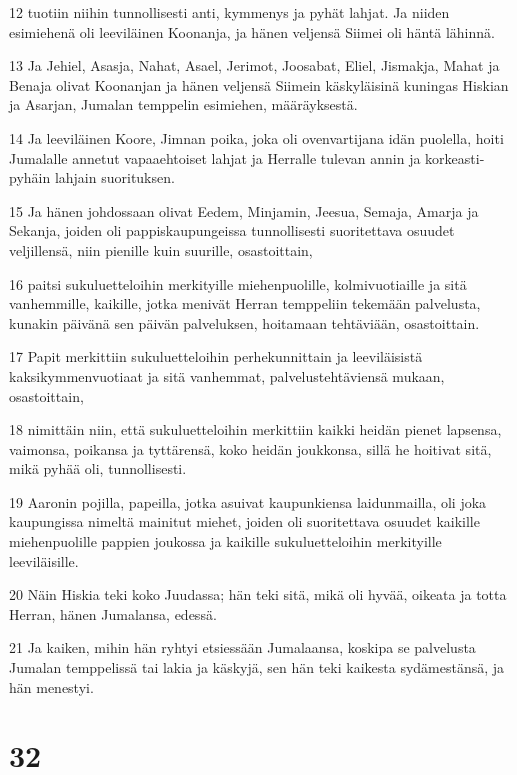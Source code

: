 \par 12 tuotiin niihin tunnollisesti anti, kymmenys ja pyhät lahjat. Ja niiden esimiehenä oli leeviläinen Koonanja, ja hänen veljensä Siimei oli häntä lähinnä.
\par 13 Ja Jehiel, Asasja, Nahat, Asael, Jerimot, Joosabat, Eliel, Jismakja, Mahat ja Benaja olivat Koonanjan ja hänen veljensä Siimein käskyläisinä kuningas Hiskian ja Asarjan, Jumalan temppelin esimiehen, määräyksestä.
\par 14 Ja leeviläinen Koore, Jimnan poika, joka oli ovenvartijana idän puolella, hoiti Jumalalle annetut vapaaehtoiset lahjat ja Herralle tulevan annin ja korkeasti-pyhäin lahjain suorituksen.
\par 15 Ja hänen johdossaan olivat Eedem, Minjamin, Jeesua, Semaja, Amarja ja Sekanja, joiden oli pappiskaupungeissa tunnollisesti suoritettava osuudet veljillensä, niin pienille kuin suurille, osastoittain,
\par 16 paitsi sukuluetteloihin merkityille miehenpuolille, kolmivuotiaille ja sitä vanhemmille, kaikille, jotka menivät Herran temppeliin tekemään palvelusta, kunakin päivänä sen päivän palveluksen, hoitamaan tehtäviään, osastoittain.
\par 17 Papit merkittiin sukuluetteloihin perhekunnittain ja leeviläisistä kaksikymmenvuotiaat ja sitä vanhemmat, palvelustehtäviensä mukaan, osastoittain,
\par 18 nimittäin niin, että sukuluetteloihin merkittiin kaikki heidän pienet lapsensa, vaimonsa, poikansa ja tyttärensä, koko heidän joukkonsa, sillä he hoitivat sitä, mikä pyhää oli, tunnollisesti.
\par 19 Aaronin pojilla, papeilla, jotka asuivat kaupunkiensa laidunmailla, oli joka kaupungissa nimeltä mainitut miehet, joiden oli suoritettava osuudet kaikille miehenpuolille pappien joukossa ja kaikille sukuluetteloihin merkityille leeviläisille.
\par 20 Näin Hiskia teki koko Juudassa; hän teki sitä, mikä oli hyvää, oikeata ja totta Herran, hänen Jumalansa, edessä.
\par 21 Ja kaiken, mihin hän ryhtyi etsiessään Jumalaansa, koskipa se palvelusta Jumalan temppelissä tai lakia ja käskyjä, sen hän teki kaikesta sydämestänsä, ja hän menestyi.

\chapter{32}

